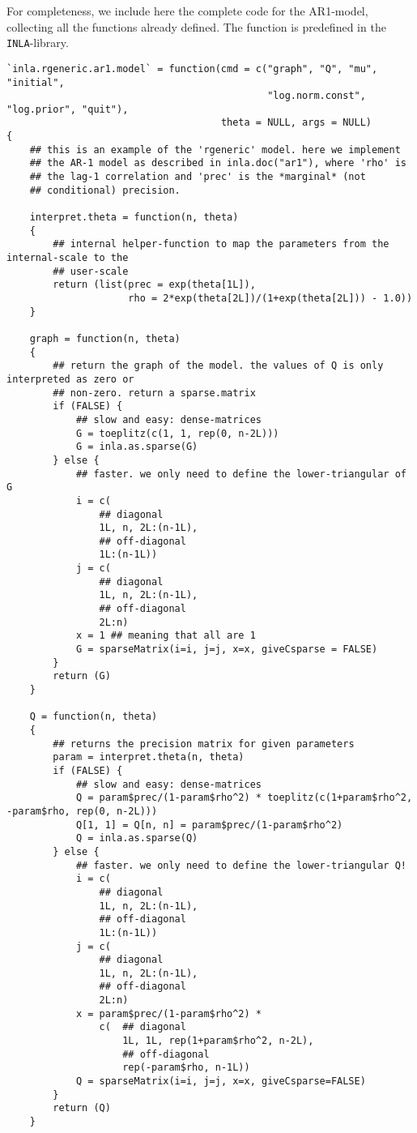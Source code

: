 \documentclass[a4paper,11pt]{article}
\begin{document}
For completeness, we include here the complete code for the AR1-model,
collecting all the functions already defined. The function is
predefined in the \texttt{INLA}-library.
{\small
\begin{verbatim}
`inla.rgeneric.ar1.model` = function(cmd = c("graph", "Q", "mu", "initial",
                                             "log.norm.const", "log.prior", "quit"),
                                     theta = NULL, args = NULL)
{
    ## this is an example of the 'rgeneric' model. here we implement
    ## the AR-1 model as described in inla.doc("ar1"), where 'rho' is
    ## the lag-1 correlation and 'prec' is the *marginal* (not
    ## conditional) precision.
    
    interpret.theta = function(n, theta)
    {
        ## internal helper-function to map the parameters from the internal-scale to the
        ## user-scale
        return (list(prec = exp(theta[1L]),
                     rho = 2*exp(theta[2L])/(1+exp(theta[2L])) - 1.0))
    }

    graph = function(n, theta)
    {
        ## return the graph of the model. the values of Q is only interpreted as zero or
        ## non-zero. return a sparse.matrix
        if (FALSE) {
            ## slow and easy: dense-matrices
            G = toeplitz(c(1, 1, rep(0, n-2L)))
            G = inla.as.sparse(G)
        } else {
            ## faster. we only need to define the lower-triangular of G
            i = c(
                ## diagonal
                1L, n, 2L:(n-1L),
                ## off-diagonal
                1L:(n-1L))
            j = c(
                ## diagonal
                1L, n, 2L:(n-1L),
                ## off-diagonal
                2L:n)
            x = 1 ## meaning that all are 1
            G = sparseMatrix(i=i, j=j, x=x, giveCsparse = FALSE)
        }            
        return (G)
    }

    Q = function(n, theta)
    {
        ## returns the precision matrix for given parameters
        param = interpret.theta(n, theta)
        if (FALSE) {
            ## slow and easy: dense-matrices
            Q = param$prec/(1-param$rho^2) * toeplitz(c(1+param$rho^2, -param$rho, rep(0, n-2L)))
            Q[1, 1] = Q[n, n] = param$prec/(1-param$rho^2)
            Q = inla.as.sparse(Q)
        } else {
            ## faster. we only need to define the lower-triangular Q!
            i = c(
                ## diagonal
                1L, n, 2L:(n-1L),
                ## off-diagonal
                1L:(n-1L))
            j = c(
                ## diagonal
                1L, n, 2L:(n-1L),
                ## off-diagonal
                2L:n)
            x = param$prec/(1-param$rho^2) *
                c(  ## diagonal
                    1L, 1L, rep(1+param$rho^2, n-2L),
                    ## off-diagonal
                    rep(-param$rho, n-1L))
            Q = sparseMatrix(i=i, j=j, x=x, giveCsparse=FALSE)
        }            
        return (Q)
    }


\end{verbatim}}
\end{document}
